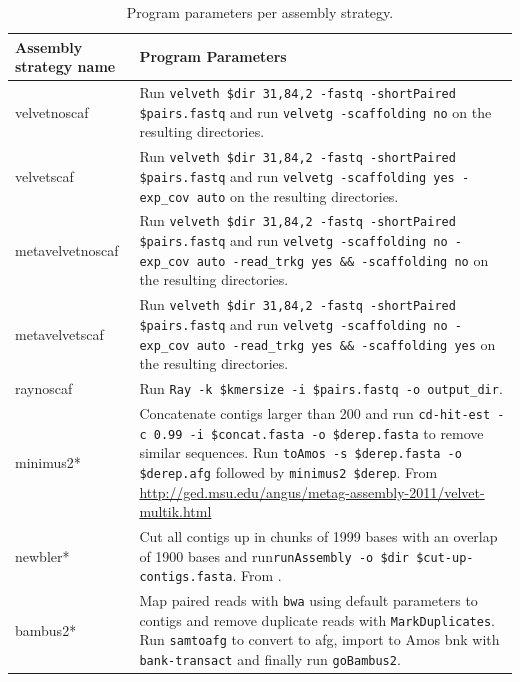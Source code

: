 \documentclass[a4paper,12pt]{report}
\begin{document}
\clearpage
\begin{landscape}
\begin{table}[h!]
\begin{tabular}{|l|p{17cm}|}
\hline
Assembly strategy name & Program Parameters\\
\hline
velvetnoscaf & Run \verb!velveth $dir 31,84,2 -fastq -shortPaired $pairs.fastq! and run \verb!velvetg -scaffolding no! on the resulting directories.\\\hline
velvetscaf & Run \verb!velveth $dir 31,84,2 -fastq -shortPaired $pairs.fastq! and run \verb!velvetg -scaffolding yes -exp_cov auto! on the resulting directories.\\\hline
metavelvetnoscaf & Run \verb!velveth $dir 31,84,2 -fastq -shortPaired $pairs.fastq! and run \verb!velvetg -scaffolding no -exp_cov auto -read_trkg yes && -scaffolding no! on the resulting directories.\\\hline
metavelvetscaf & Run \verb!velveth $dir 31,84,2 -fastq -shortPaired $pairs.fastq! and run \verb!velvetg -scaffolding no -exp_cov auto -read_trkg yes && -scaffolding yes! on the resulting directories.\\\hline
raynoscaf & Run \verb!Ray -k $kmersize -i $pairs.fastq -o output_dir!.\\\hline
minimus2* & Concatenate contigs larger than 200 and run \newline\verb!cd-hit-est -c 0.99 -i $concat.fasta -o $derep.fasta! to remove similar sequences. Run \verb!toAmos -s $derep.fasta -o $derep.afg! followed by \verb!minimus2 $derep!. From \url{http://ged.msu.edu/angus/metag-assembly-2011/velvet-multik.html} \\\hline
newbler* & Cut all contigs up in chunks of 1999 bases with an overlap of 1900 bases and run\newline \verb!runAssembly -o $dir $cut-up-contigs.fasta!. From \cite{Luo22347999}. \\\hline
bambus2* & Map paired reads with \verb!bwa! using default parameters to contigs and remove duplicate reads with \verb!MarkDuplicates!. Run \verb!samtoafg! to convert to afg, import to Amos bnk with \verb!bank-transact! and finally run \verb!goBambus2!.\\\hline
\hline
\end{tabular}
\caption{Program parameters per assembly strategy.}
\label{tab:asmstratparameters}
\end{table}
\end{landscape}
\end{document}
